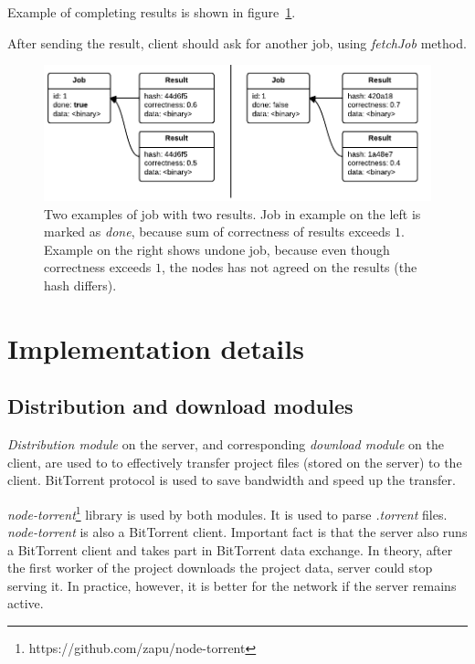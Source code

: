 Example of completing results is shown in figure~\ref{f:sendresultsex}.

After sending the result, client should ask for another job, using \emph{fetchJob} method.

\begin{figure}
\centering
\includegraphics{diagrams/SendResultsExample.pdf}
\caption{Two examples of job with two results. Job in example on the left is marked as \emph{done}, because sum of correctness of results exceeds $1$. Example on the right shows undone job, because even though correctness exceeds $1$, the nodes has not agreed on the results (the hash differs).}
\label{f:sendresultsex}
\end{figure}

\section{Implementation details}
\label{s:impldet}

\subsection{Distribution and download modules}
\label{s:torrent_dist}

\emph{Distribution module} on the server, and corresponding \emph{download module} on the client, are used to to effectively transfer project files (stored on the server) to the client. BitTorrent protocol is used to save bandwidth and speed up the transfer.

\emph{node-torrent}\footnote{https://github.com/zapu/node-torrent} library is used by both modules. It is used to parse \emph{.torrent} files. \emph{node-torrent} is also a BitTorrent client. Important fact is that the server also runs a BitTorrent client and takes part in BitTorrent data exchange. In theory, after the first worker of the project downloads the project data, server could stop serving it. In practice, however, it is better for the network if the server remains active.

